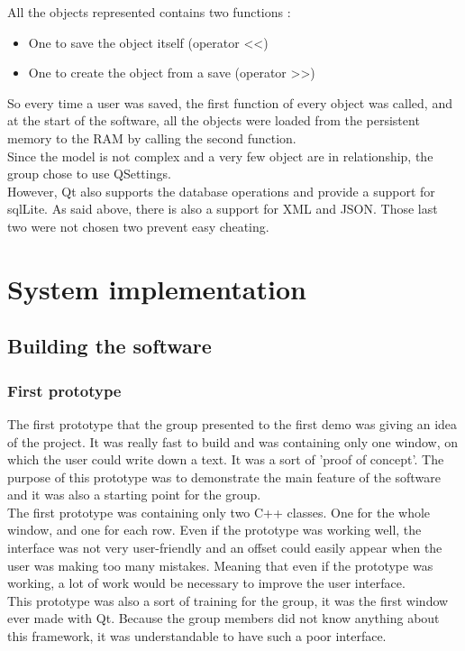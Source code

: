 All the objects represented contains two functions :
\begin{itemize}
	\item One to save the object itself (operator <<)
	\item One to create the object from a save (operator >>)
\end{itemize}

So every time a user was saved, the first function of every object was called, and at the start of the software, all the objects were loaded from the persistent memory to the RAM by calling the second function.\\
Since the model is not complex and a very few object are in relationship, the group chose to use QSettings. \\
However, Qt also supports the database operations and provide a support for sqlLite. As said above, there is also a support for XML and JSON. Those last two were not chosen two prevent easy cheating.


\part{System implementation}
\chapter{Building the software}
\section{First prototype}
The first prototype that the group presented to the first demo was giving an idea of the project. It was really fast to build and was containing only one window, on which the user could write down a text. It was a sort of 'proof of concept'. The purpose of this prototype was to demonstrate the main feature of the software and it was also a starting point for the group.\\
The first prototype was containing only two C++ classes. One for the whole window, and one for each row. Even if the prototype was working well, the interface was not very user-friendly and an offset could easily appear when the user was making too many mistakes.
Meaning that even if the prototype was working, a lot of work would be necessary to improve the user interface. \\
This prototype was also a sort of training for the group, it was the first window ever made with Qt. Because the group members did not know anything about this framework, it was understandable to have such a poor interface.

